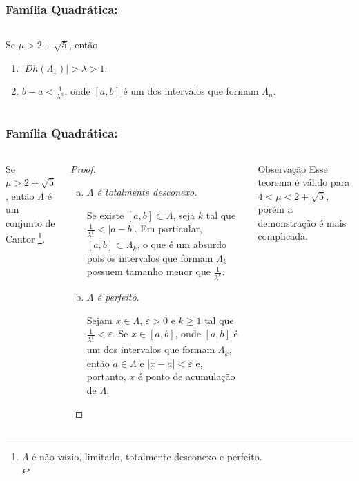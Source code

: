 
\begin{frame}
\vspace{5pt}
\frametitle{Família Quadrática: \subsecname}
\begin{columns}
\column{\dimexpr\paperwidth-15pt}

\begin{lemma}
Se $\mu > 2 + \sqrt{5}$, então
\begin{enumerate}
\item  $|D h(\Lambda_1)| > \lambda > 1$.
\item $b - a < \frac{1}{\lambda^n}$, onde $[a, b]$ é um dos intervalos que formam $\Lambda_n$.
\end{enumerate}
\end{lemma}

\end{columns}
\end{frame}


\begin{frame}
\vspace{5pt}
\frametitle{Família Quadrática: \subsecname}
\begin{columns}
\column{\dimexpr\paperwidth-15pt}

\begin{theorem}
Se $\mu > 2 + \sqrt{5}$, então $\Lambda$ é um conjunto de Cantor \footnote{$\Lambda$ é não vazio, limitado, totalmente desconexo e perfeito.\\}.
\end{theorem}

\begin{proof}
\begin{enumerate}[a)]
\item \textit{$\Lambda$ é totalmente desconexo.}

Se existe $[a, b] \subset \Lambda$, seja $k$ tal que $\frac{1}{\lambda^k} < |a - b|$.
Em particular, $[a, b] \subset \Lambda_k$, o que é um absurdo pois os intervalos que formam $\Lambda_k$ possuem tamanho menor que $\frac{1}{\lambda^k}$.

\item \textit{$\Lambda$ é perfeito.}

Sejam $x \in \Lambda$, $\varepsilon > 0$ e $k \geq 1$ tal que $\frac{1}{\lambda^k} < \varepsilon$.
Se $x \in [a, b]$, onde $[a, b]$ é um dos intervalos que formam $\Lambda_k$, então $a \in \Lambda$ e $|x - a| < \varepsilon$ e, portanto, $x$ é ponto de acumulação de $\Lambda$.
\qedhere
\end{enumerate}
\end{proof}

\begin{block}{Observação}
Esse teorema é válido para $4 < \mu < 2 + \sqrt{5}$, porém a demonstração é mais complicada.
\end{block}

\end{columns}
\end{frame}
